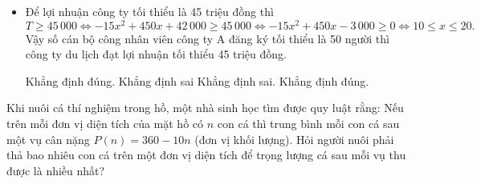 \begin{ex}
{\begin{itemize}
			Lợi nhuận của công ty du lịch đạt được  là
			\begin{eqnarray*}
				T &=& (3\,000-15x)(40+x)-1950(40+x)\\ 
				&=&-15x^2-600x+3\,000x+120\,000-1\,950x-78\,000\\ 
				&=&-15x^2+450x+42\,000\quad\text{(nghìn  đồng).}
			\end{eqnarray*}
			\item Để lợi nhuận công ty tối thiểu là 45 triệu đồng  thì $$T\ge45\,000\Leftrightarrow-15x^2+450x+42\,000\ge45\,000\Leftrightarrow-15x^2+450x-3\,000\ge0\Leftrightarrow10\le x\le20.$$
			Vậy số  cán bộ công nhân viên công ty A đăng ký tối thiểu là 50 người thì công ty du lịch đạt lợi nhuận tối thiểu 45 triệu đồng.
			\begin{itemchoice}
				\itemch  Khẳng định đúng.
				\itemch Khẳng  định sai
				\itemch Khẳng  định sai.
				\itemch  Khẳng định đúng.
			\end{itemchoice}
	\end{itemize}}
\end{ex}



\begin{bt}%
	Khi nuôi cá thí nghiệm trong hồ, một nhà sinh học tìm được quy luật rằng: Nếu trên mỗi đơn vị diện tích của mặt hồ có $n$  con cá thì trung bình mỗi con cá sau một vụ cân nặng $P(n)=360-10 n$ (đơn vị khối lượng). Hỏi người nuôi phải thả bao nhiêu con cá trên một đơn vị diện tích để trọng lượng cá sau mỗi vụ thu được là nhiều nhất?
	 \\
\end{bt}


